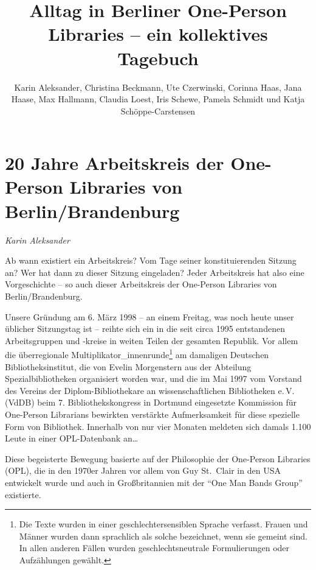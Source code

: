 \documentclass[a4paper,
fontsize=11pt,
oneside,
numbers=noperiodatend,
parskip=half-,
bibliography=totoc,
final
]{scrartcl}
\title{\LARGE{Alltag in Berliner One-Person Libraries -- ein kollektives Tagebuch}} %
\author{\parbox{10cm}{Karin Aleksander, Christina Beckmann, Ute Czerwinski, Corinna Haas, Jana Haase, Max Hallmann, Claudia Loest, Iris Schewe, Pamela Schmidt und Katja Schöppe-Carstensen}} %
\date{}
\begin{document}
\maketitle
\thispagestyle{fancyplain} 


\hypertarget{jahre-arbeitskreis-der-one-person-libraries-von-berlinbrandenburg}{%
\section*{20 Jahre Arbeitskreis der One-Person Libraries von
Berlin/Brandenburg}\label{jahre-arbeitskreis-der-one-person-libraries-von-berlinbrandenburg}}

\emph{Karin Aleksander}

Ab wann existiert ein Arbeitskreis? Vom Tage seiner konstituierenden
Sitzung an? Wer hat dann zu dieser Sitzung eingeladen? Jeder
Arbeitskreis hat also eine Vorgeschichte -- so auch dieser Arbeitskreis
der One-Person Libraries von Berlin/Brandenburg.

Unsere Gründung am 6. März 1998 -- an einem Freitag, was noch heute
unser üblicher Sitzungstag ist -- reihte sich ein in die seit circa 1995
entstandenen Arbeitsgruppen und -kreise in weiten Teilen der gesamten
Republik. Vor allem die überregionale
Multiplikator\_innenrunde\footnote{Die Texte wurden in einer
  geschlechtersensiblen Sprache verfasst. Frauen und Männer wurden dann
  sprachlich als solche bezeichnet, wenn sie gemeint sind. In allen
  anderen Fällen wurden geschlechtsneutrale Formulierungen oder
  Aufzählungen gewählt.} am damaligen Deutschen Bibliotheksinstitut, die
von Evelin Morgenstern aus der Abteilung Spezialbibliotheken organisiert
worden war, und die im Mai 1997 vom Vorstand des Vereins der
Diplom-Bibliothekare an wissenschaftlichen Bibliotheken e.\,V. (VdDB)
beim 7. Bibliothekskongress in Dortmund eingesetzte Kommission für
One-Person Librarians bewirkten verstärkte Aufmerksamkeit für diese
spezielle Form von Bibliothek. Innerhalb von nur vier Monaten meldeten
sich damals 1.100 Leute in einer OPL-Datenbank an\ldots{}

Diese begeisterte Bewegung basierte auf der Philosophie der One-Person
Libraries (OPL), die in den 1970er Jahren vor allem von Guy St.~Clair in
den USA entwickelt wurde und auch in Großbritannien mit der \enquote{One
Man Bands Group} existierte.
\end{document}
